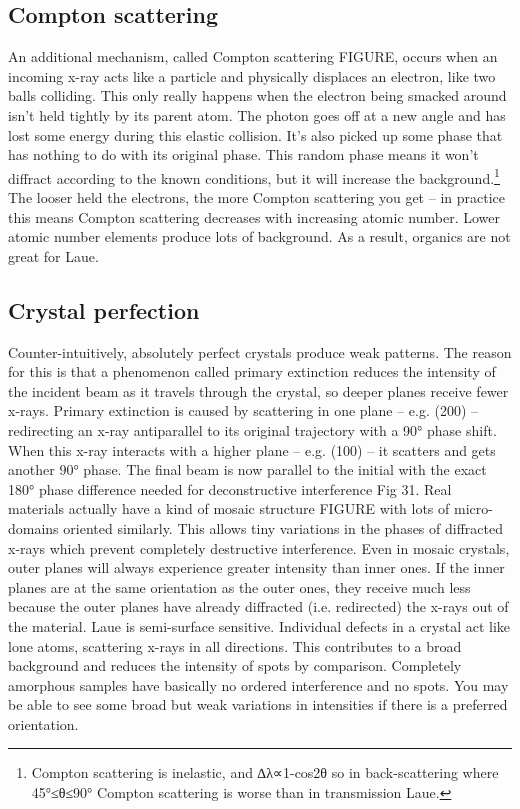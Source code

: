 \subsection{Compton scattering}
An additional mechanism, called Compton scattering FIGURE, occurs when an incoming x-ray acts like a particle and physically displaces an electron, like two balls colliding. This only really happens when the electron being smacked around isn’t held tightly by its parent atom. The photon goes off at a new angle and has lost some energy during this elastic collision. It’s also picked up some phase that has nothing to do with its original phase. This random phase means it won’t diffract according to the known conditions, but it will increase the background.\footnote{Compton scattering is inelastic, and ∆λ∝1-cos⁡2θ so in back-scattering where 45°≤θ≤90° Compton scattering is worse than in transmission Laue.}  
The looser held the electrons, the more Compton scattering you get – in practice this means Compton scattering decreases with increasing atomic number. Lower atomic number elements produce lots of background. As a result, organics are not great for Laue.
\subsection{Crystal perfection}
Counter-intuitively, absolutely perfect crystals produce weak patterns. The reason for this is that a phenomenon called primary extinction reduces the intensity of the incident beam as it travels through the crystal, so deeper planes receive fewer x-rays. Primary extinction is caused by scattering in one plane – e.g. (200) – redirecting an x-ray antiparallel to its original trajectory with a 90° phase shift. When this x-ray interacts with a higher plane – e.g. (100) – it scatters and gets another 90° phase. The final beam is now parallel to the initial with the exact 180° phase difference needed for deconstructive interference Fig 31.
Real materials actually have a kind of mosaic structure FIGURE with lots of micro-domains oriented similarly. This allows tiny variations in the phases of diffracted x-rays which prevent completely destructive interference.
Even in mosaic crystals, outer planes will always experience greater intensity than inner ones. If the inner planes are at the same orientation as the outer ones, they receive much less because the outer planes have already diffracted (i.e. redirected) the x-rays out of the material. Laue is semi-surface sensitive.
Individual defects in a crystal act like lone atoms, scattering x-rays in all directions. This contributes to a broad background and reduces the intensity of spots by comparison. Completely amorphous samples have basically no ordered interference and no spots. You may be able to see some broad but weak variations in intensities if there is a preferred orientation.
